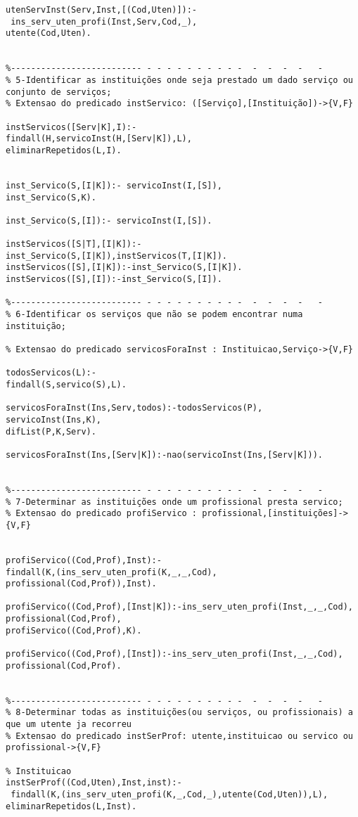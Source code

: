 \documentclass[pdftex,12pt,a4paper]{report}
\begin{document}
\begin{appendices}
\begin{Verbatim}
utenServInst(Serv,Inst,[(Cod,Uten)]):-
 ins_serv_uten_profi(Inst,Serv,Cod,_),
utente(Cod,Uten).


%-------------------------- - - - - - - - - - -  -  -  -  -   -
% 5-Identificar as instituições onde seja prestado um dado serviço ou conjunto de serviços;
% Extensao do predicado instServico: ([Serviço],[Instituição])->{V,F}    

instServicos([Serv|K],I):-    
findall(H,servicoInst(H,[Serv|K]),L),
eliminarRepetidos(L,I).


inst_Servico(S,[I|K]):- servicoInst(I,[S]),
inst_Servico(S,K).  

inst_Servico(S,[I]):- servicoInst(I,[S]).

instServicos([S|T],[I|K]):-
inst_Servico(S,[I|K]),instServicos(T,[I|K]).
instServicos([S],[I|K]):-inst_Servico(S,[I|K]).
instServicos([S],[I]):-inst_Servico(S,[I]).

%-------------------------- - - - - - - - - - -  -  -  -  -   -         
% 6-Identificar os serviços que não se podem encontrar numa instituição;

% Extensao do predicado servicosForaInst : Instituicao,Serviço->{V,F}

todosServicos(L):-
findall(S,servico(S),L).

servicosForaInst(Ins,Serv,todos):-todosServicos(P), 
servicoInst(Ins,K),
difList(P,K,Serv).

servicosForaInst(Ins,[Serv|K]):-nao(servicoInst(Ins,[Serv|K])).


%-------------------------- - - - - - - - - - -  -  -  -  -   -         
% 7-Determinar as instituições onde um profissional presta servico;
% Extensao do predicado profiServico : profissional,[instituições]->{V,F}


profiServico((Cod,Prof),Inst):- 
findall(K,(ins_serv_uten_profi(K,_,_,Cod),
profissional(Cod,Prof)),Inst).

profiServico((Cod,Prof),[Inst|K]):-ins_serv_uten_profi(Inst,_,_,Cod),
profissional(Cod,Prof),
profiServico((Cod,Prof),K).

profiServico((Cod,Prof),[Inst]):-ins_serv_uten_profi(Inst,_,_,Cod),
profissional(Cod,Prof).


%-------------------------- - - - - - - - - - -  -  -  -  -   -         
% 8-Determinar todas as instituições(ou serviços, ou profissionais) a que um utente ja recorreu
% Extensao do predicado instSerProf: utente,instituicao ou servico ou profissional->{V,F}

% Instituicao
instSerProf((Cod,Uten),Inst,inst):-
 findall(K,(ins_serv_uten_profi(K,_,Cod,_),utente(Cod,Uten)),L),
eliminarRepetidos(L,Inst).


\end{Verbatim}
\end{appendices}
\end{document}
